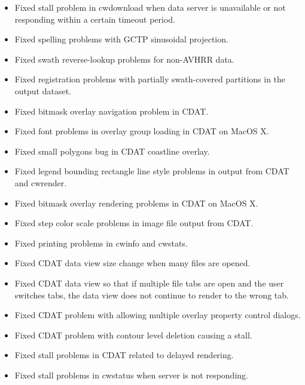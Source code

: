 \begin{itemize}

  \item Fixed stall problem in cwdownload when data server is
  unavailable or not responding within a certain timeout period.

  \item Fixed spelling problems with GCTP sinusoidal projection.

  \item Fixed swath reverse-lookup problems for non-AVHRR data.

  \item Fixed registration problems with partially swath-covered
  partitions in the output dataset.

  \item Fixed bitmask overlay navigation problem in CDAT.

  \item Fixed font problems in overlay group loading in CDAT on MacOS
  X.

  \item Fixed small polygons bug in CDAT coastline overlay.

  \item Fixed legend bounding rectangle line style problems in output
  from CDAT and cwrender.

  \item Fixed bitmask overlay rendering problems in CDAT on MacOS X.

  \item Fixed step color scale problems in image file output from
  CDAT.

  \item Fixed printing problems in cwinfo and cwstats.

  \item Fixed CDAT data view size change when many files are opened.

  \item Fixed CDAT data view so that if multiple file tabs are open
  and the user switches tabs, the data view does not continue to
  render to the wrong tab.

  \item Fixed CDAT problem with allowing multiple overlay property
  control dialogs.

  \item Fixed CDAT problem with contour level deletion causing a
  stall.

  \item Fixed stall problems in CDAT related to delayed rendering.

  \item Fixed stall problems in cwstatus when server is not
  responding.

\end{itemize}


